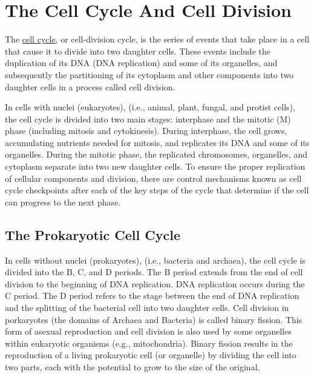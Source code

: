 \hypertarget{the-cell-cycle-and-cell-division}{%
\chapter{The Cell Cycle And Cell Division}\label{the-cell-cycle-and-cell-division}}

The \href{https://en.wikipedia.org/wiki/Cell_cycle}{cell cycle}, or cell-division cycle, is the series of events that take place in a cell that cause it to divide into two daughter cells. These events include the duplication of its DNA (DNA replication) and some of its organelles, and subsequently the partitioning of its cytoplasm and other components into two daughter cells in a process called cell division.

In cells with nuclei (eukaryotes), (i.e., animal, plant, fungal, and protist cells), the cell cycle is divided into two main stages: interphase and the mitotic (M) phase (including mitosis and cytokinesis). During interphase, the cell grows, accumulating nutrients needed for mitosis, and replicates its DNA and some of its organelles. During the mitotic phase, the replicated chromosomes, organelles, and cytoplasm separate into two new daughter cells. To ensure the proper replication of cellular components and division, there are control mechanisms known as cell cycle checkpoints after each of the key steps of the cycle that determine if the cell can progress to the next phase.

\hypertarget{the-prokaryotic-cell-cycle}{%
\section{The Prokaryotic Cell Cycle}\label{the-prokaryotic-cell-cycle}}

In cells without nuclei (prokaryotes), (i.e., bacteria and archaea), the cell cycle is divided into the B, C, and D periods. The B period extends from the end of cell division to the beginning of DNA replication. DNA replication occurs during the C period. The D period refers to the stage between the end of DNA replication and the splitting of the bacterial cell into two daughter cells. Cell division in porkaryotes (the domains of Archaea and Bacteria) is called binary fission. This form of asexual reproduction and cell division is also used by some organelles within eukaryotic organisms (e.g., mitochondria). Binary fission results in the reproduction of a living prokaryotic cell (or organelle) by dividing the cell into two parts, each with the potential to grow to the size of the original.

